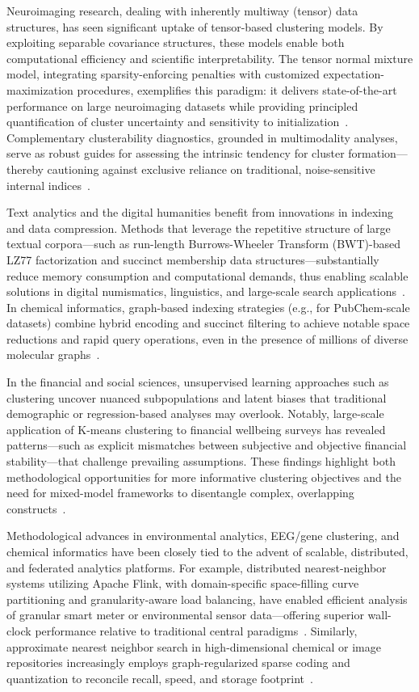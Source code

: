 \documentclass[sigconf]{acmart}
\begin{document}
Neuroimaging research, dealing with inherently multiway (tensor) data structures, has seen significant uptake of tensor-based clustering models. By exploiting separable covariance structures, these models enable both computational efficiency and scientific interpretability. The tensor normal mixture model, integrating sparsity-enforcing penalties with customized expectation-maximization procedures, exemplifies this paradigm: it delivers state-of-the-art performance on large neuroimaging datasets while providing principled quantification of cluster uncertainty and sensitivity to initialization~\cite{ref57}. Complementary clusterability diagnostics, grounded in multimodality analyses, serve as robust guides for assessing the intrinsic tendency for cluster formation—thereby cautioning against exclusive reliance on traditional, noise-sensitive internal indices~\cite{ref58}.

Text analytics and the digital humanities benefit from innovations in indexing and data compression. Methods that leverage the repetitive structure of large textual corpora—such as run-length Burrows-Wheeler Transform (BWT)-based LZ77 factorization and succinct membership data structures—substantially reduce memory consumption and computational demands, thus enabling scalable solutions in digital numismatics, linguistics, and large-scale search applications~\cite{ref66,ref78,ref96}. In chemical informatics, graph-based indexing strategies (e.g., for PubChem-scale datasets) combine hybrid encoding and succinct filtering to achieve notable space reductions and rapid query operations, even in the presence of millions of diverse molecular graphs~\cite{ref92,ref93}.

In the financial and social sciences, unsupervised learning approaches such as clustering uncover nuanced subpopulations and latent biases that traditional demographic or regression-based analyses may overlook. Notably, large-scale application of K-means clustering to financial wellbeing surveys has revealed patterns—such as explicit mismatches between subjective and objective financial stability—that challenge prevailing assumptions. These findings highlight both methodological opportunities for more informative clustering objectives and the need for mixed-model frameworks to disentangle complex, overlapping constructs~\cite{ref59}.

Methodological advances in environmental analytics, EEG/gene clustering, and chemical informatics have been closely tied to the advent of scalable, distributed, and federated analytics platforms. For example, distributed nearest-neighbor systems utilizing Apache Flink, with domain-specific space-filling curve partitioning and granularity-aware load balancing, have enabled efficient analysis of granular smart meter or environmental sensor data—offering superior wall-clock performance relative to traditional central paradigms~\cite{ref80}. Similarly, approximate nearest neighbor search in high-dimensional chemical or image repositories increasingly employs graph-regularized sparse coding and quantization to reconcile recall, speed, and storage footprint~\cite{ref85,ref86,ref95}.
\end{document}
